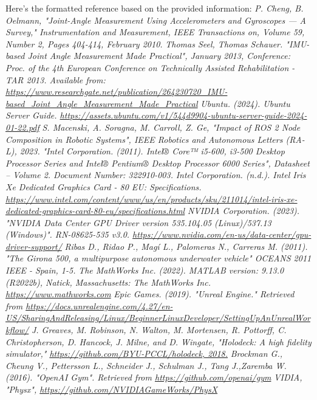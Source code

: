 \documentclass[]{article}
\begin{document}
\begin{thebibliography}{2}
	Here's the formatted reference based on the provided information:
	\bibitem[24]{} \textit{P. Cheng, B. Oelmann, "Joint-Angle Measurement Using Accelerometers and Gyroscopes — A Survey," Instrumentation and Measurement, IEEE Transactions on, Volume 59, Number 2, Pages 404-414, February 2010.}
	\bibitem[25]{} \textit{Thomas Seel, Thomas Schauer. "IMU-based Joint Angle Measurement Made Practical", January 2013, Conference: Proc. of the 4th European Conference on Technically Assisted Rehabilitation - TAR 2013. Available from: \url{https://www.researchgate.net/publication/264230720_IMU-based_Joint_Angle_Measurement_Made_Practical} }
	\bibitem[26]{} \textit{Ubuntu. (2024). Ubuntu Server Guide. \url{https://assets.ubuntu.com/v1/544d9904-ubuntu-server-guide-2024-01-22.pdf}}
	\bibitem[27]{} \textit{S. Macenski, A. Soragna, M. Carroll, Z. Ge, "Impact of ROS 2 Node Composition in Robotic Systems", IEEE Robotics and Autonomous Letters (RA-L), 2023.}
	\bibitem[28]{} \textit{"Intel Corporation. (2011). Intel® Core™ i5-600, i3-500 Desktop Processor Series and Intel® Pentium® Desktop Processor 6000 Series", Datasheet – Volume 2. Document Number: 322910-003.}
	\bibitem[29]{} \textit{Intel Corporation. (n.d.). Intel Iris Xe Dedicated Graphics Card - 80 EU: Specifications. \url{https://www.intel.com/content/www/us/en/products/sku/211014/intel-iris-xe-dedicated-graphics-card-80-eu/specifications.html}}
	\bibitem[30]{} \textit{NVIDIA Corporation. (2023). "NVIDIA Data Center GPU Driver version 535.104.05 (Linux)/537.13 (Windows)". RN-08625-535 v3.0. \url{https://www.nvidia.com/en-us/data-center/gpu-driver-support/}}
	\bibitem[31]{} \textit{Ribas D., Ridao P., Magí L., Palomeras N.,  Carreras M. (2011). "The Girona 500, a multipurpose autonomous underwater vehicle" OCEANS 2011 IEEE - Spain, 1-5.}
	\bibitem[32]{} \textit {The MathWorks Inc. (2022). MATLAB version: 9.13.0 (R2022b), Natick, Massachusetts: The MathWorks Inc. \url{https://www.mathworks.com}}
	\bibitem[33]{} \textit{Epic Games. (2019). "Unreal Engine." Retrieved from \url{https://docs.unrealengine.com/4.27/en-US/SharingAndReleasing/Linux/BeginnerLinuxDeveloper/SettingUpAnUnrealWorkflow/}}
	\bibitem[34]{} \textit{J. Greaves, M. Robinson, N. Walton, M. Mortensen, R. Pottorff, C. Christopherson, D. Hancock, J. Milne, and D. Wingate, "Holodeck: A high fidelity simulator," \url{https://github.com/BYU-PCCL/holodeck, 2018.}}
	\bibitem[35]{} \textit{Brockman G., Cheung V., Pettersson L., Schneider J., Schulman J., Tang J.,Zaremba W. (2016). "OpenAI Gym". Retrieved from \url{https://github.com/openai/gym}}
	\bibitem[36]{} \textit{VIDIA, "Physx", \url{ https://github.com/NVIDIAGameWorks/PhysX}}

\end{thebibliography}
\end{document}
